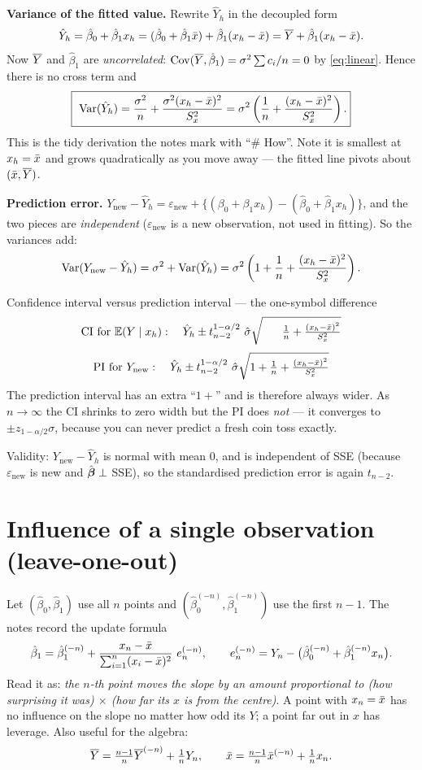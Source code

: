 \documentclass[11pt]{article}
\begin{document}
\textbf{Variance of the fitted value.} Rewrite $\hat Y_h$ in the decoupled form
\[
  \hat Y_h = \hat\beta_0+\hat\beta_1x_h = (\hat\beta_0+\hat\beta_1\bar{x})+\hat\beta_1(x_h-\bar{x})
  = \overline{Y} + \hat\beta_1(x_h-\bar{x}).
\]
Now $\overline{Y}$ and $\hat\beta_1$ are \emph{uncorrelated}: $\operatorname{Cov}(\overline{Y},\hat\beta_1)=\sigma^2\sum c_i/n = 0$
by \eqref{eq:linear}. Hence there is no cross term and
\[
  \boxed{\ \operatorname{Var}(\hat Y_h)=\frac{\sigma^2}{n}+\frac{\sigma^2 (x_h-\bar{x})^2}{S_x^2}
  = \sigma^2\left(\frac1n+\frac{(x_h-\bar{x})^2}{S_x^2}\right).}
\]
This is the tidy derivation the notes mark with ``\# How''. Note it is smallest at
$x_h=\bar{x}$ and grows quadratically as you move away --- the fitted line pivots about
$(\bar{x},\overline{Y})$.

\textbf{Prediction error.} $Y_{\text{new}}-\hat Y_h
= \varepsilon_{\text{new}} + \{(\beta_0+\beta_1x_h)-(\hat\beta_0+\hat\beta_1x_h)\}$, and the
two pieces are \emph{independent} ($\varepsilon_{\text{new}}$ is a new observation, not used
in fitting). So the variances add:
\[
  \operatorname{Var}(Y_{\text{new}}-\hat Y_h)= \sigma^2 + \operatorname{Var}(\hat Y_h)
  = \sigma^2\left(1+\frac1n+\frac{(x_h-\bar{x})^2}{S_x^2}\right).
\]

\begin{recipe}{Confidence interval versus prediction interval --- the one-symbol difference}
\[
  \text{CI for }\E(Y\mid x_h):\quad
  \hat Y_h \pm t^{1-\alpha/2}_{n-2}\ \hat\sigma\sqrt{\phantom{1+{}}\tfrac1n+\tfrac{(x_h-\xbar)^2}{S_x^2}}
\]
\[
  \text{PI for }Y_{\text{new}}:\quad
  \hat Y_h \pm t^{1-\alpha/2}_{n-2}\ \hat\sigma\sqrt{1+\tfrac1n+\tfrac{(x_h-\xbar)^2}{S_x^2}}
\]
The prediction interval has an extra ``$1+$'' and is therefore always wider. As
$n\to\infty$ the CI shrinks to zero width but the PI does \emph{not} --- it converges to
$\pm z_{1-\alpha/2}\sigma$, because you can never predict a fresh coin toss exactly.
\end{recipe}

Validity: $Y_{\text{new}}-\hat Y_h$ is normal with mean $0$, and is independent of SSE
(because $\varepsilon_{\text{new}}$ is new and $\hat{\boldsymbol{\beta}}\perp$ SSE), so the standardised
prediction error is again $t_{n-2}$.

\section{Influence of a single observation (leave-one-out)}

Let $(\hat\beta_0,\hat\beta_1)$ use all $n$ points and $(\hat\beta_0^{(-n)},\hat\beta_1^{(-n)})$
use the first $n-1$. The notes record the update formula
\[
  \hat\beta_1 = \hat\beta_1^{(-n)} + \frac{x_n-\bar{x}}{\sum_{i=1}^n(x_i-\bar{x})^2}\ e_n^{(-n)},
  \qquad e_n^{(-n)} = Y_n - \big(\hat\beta_0^{(-n)}+\hat\beta_1^{(-n)}x_n\big).
\]
Read it as: \emph{the $n$-th point moves the slope by an amount proportional to (how
surprising it was) $\times$ (how far its $x$ is from the centre)}. A point with $x_n=\bar{x}$
has no influence on the slope no matter how odd its $Y$; a point far out in $x$ has
leverage. Also useful for the algebra:
\[
  \overline{Y} = \tfrac{n-1}{n}\overline{Y}^{(-n)}+\tfrac1n Y_n, \qquad
  \bar{x} = \tfrac{n-1}{n}\bar{x}^{(-n)}+\tfrac1n x_n .
\]
\end{document}
